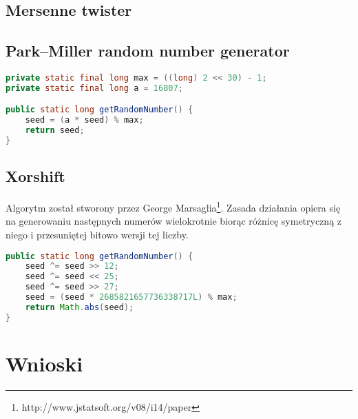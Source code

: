 \documentclass[a4paper, 11pt]{article} %
\begin{document}
\subsection{Mersenne twister}


\subsection{Park–Miller random number generator}

\begin{lstlisting}[style=mystyle, language=java, frame=single]
private static final long max = ((long) 2 << 30) - 1;
private static final long a = 16807;

public static long getRandomNumber() {
    seed = (a * seed) % max;
    return seed;
}
\end{lstlisting}

\subsection{Xorshift}
Algorytm został stworony przez George Marsaglia\footnote{http://www.jstatsoft.org/v08/i14/paper}. Zasada działania opiera się na generowaniu następnych numerów wielokrotnie biorąc różnicę symetryczną z niego i przesuniętej bitowo wersji tej liczby.


\begin{lstlisting}[style=mystyle, language=java, frame=single]
public static long getRandomNumber() {
    seed ^= seed >> 12;
    seed ^= seed << 25;
    seed ^= seed >> 27;
    seed = (seed * 2685821657736338717L) % max;
    return Math.abs(seed);
}
\end{lstlisting}

\section*{Wnioski}






\end{document}
